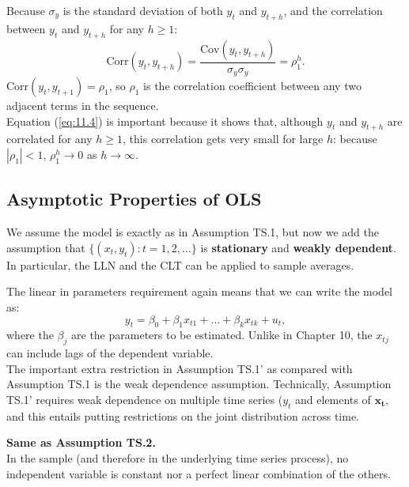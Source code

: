 \documentclass[a4paper, 10pt]{article}
\theoremstyle{definition}	%
\begin{document}
Because \( \sigma_y \) is the standard deviation of both \( y_t \) and \( y_{t+h} \), and the correlation between \( y_t \) and \( y_{t+h} \) for any \( h \geq 1 \):
\begin{equation}
\text{Corr}(y_t, y_{t+h}) = \frac{\text{Cov}(y_t, y_{t+h})}{\sigma_y \sigma_y} = \rho_1^h.
\label{eq:11.4}
\end{equation}
\( \text{Corr}(y_t, y_{t+1}) = \rho_1 \), so \( \rho_1 \) is the correlation coefficient between any two adjacent terms in the sequence.\\
Equation (\ref{eq:11.4}) is important because it shows that, although \( y_t \) and \( y_{t+h} \) are correlated for any \( h \geq 1 \), this correlation gets very small for large \( h \): because \( |\rho_1| < 1 \), \( \rho_1^h \to 0 \) as \( h \to \infty \).

\subsection{Asymptotic Properties of OLS}

\begin{tcolorbox}[colback=blue!5!white, colframe=blue!80!black, title=Assumption TS.1' -- Linearity in Parameters]
We assume the model is exactly as in Assumption TS.1, but now we add the assumption that \( \{(x_t, y_t): t = 1, 2, \ldots\} \) is \textbf{stationary} and \textbf{weakly dependent}. In particular, the LLN and the CLT can be applied to sample averages.
\end{tcolorbox}
The linear in parameters requirement again means that we can write the model as:
\begin{equation}
y_t = \beta_0 + \beta_1 x_{t1} + \dots + \beta_k x_{tk} + u_t,
\label{eq:11.5}
\end{equation}
where the \( \beta_j \) are the parameters to be estimated. Unlike in Chapter 10, the \( x_{tj} \) can include lags of the dependent variable.\\
The important extra restriction in Assumption TS.1' as compared with Assumption TS.1 is the weak dependence assumption. Technically, Assumption TS.1' requires weak dependence on multiple time series (\( y_t \) and elements of 
\( \mathbf{x_t} \), and this entails putting restrictions on the joint distribution across time.
\begin{tcolorbox}[colback=blue!5!white, colframe=blue!80!black, title=Assumption TS.2' -- No Perfect Collinearity]
\textbf{Same as Assumption TS.2.} \\
In the sample (and therefore in the underlying time series process), no independent variable is constant nor a perfect linear combination of the others.
\end{tcolorbox}
\end{document}
